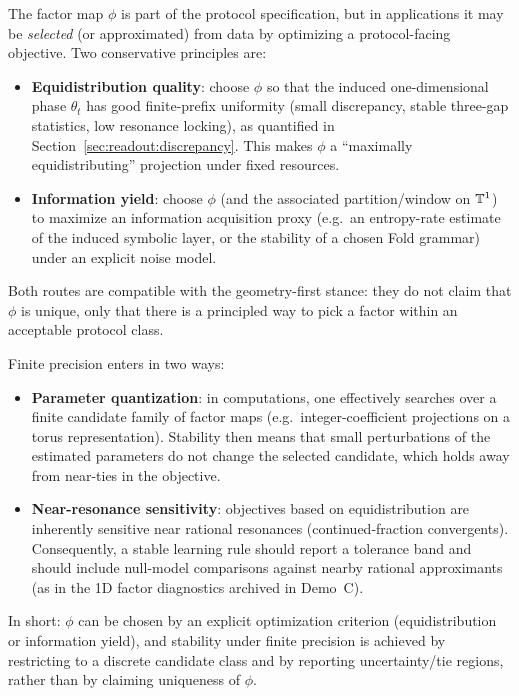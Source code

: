 \begin{remark}\label{rem:learn-phi}
The factor map $\phi$ is part of the protocol specification, but in applications it may be \emph{selected} (or approximated) from data by optimizing a protocol-facing objective. Two conservative principles are:
\begin{itemize}[leftmargin=*,itemsep=2pt]
  \item \textbf{Equidistribution quality}: choose $\phi$ so that the induced one-dimensional phase $\theta_t$ has good finite-prefix uniformity (small discrepancy, stable three-gap statistics, low resonance locking), as quantified in Section~\ref{sec:readout:discrepancy}. This makes $\phi$ a ``maximally equidistributing'' projection under fixed resources.
  \item \textbf{Information yield}: choose $\phi$ (and the associated partition/window on $\mathbb{T}^1$) to maximize an information acquisition proxy (e.g.\ an entropy-rate estimate of the induced symbolic layer, or the stability of a chosen Fold grammar) under an explicit noise model.
\end{itemize}
Both routes are compatible with the geometry-first stance: they do not claim that $\phi$ is unique, only that there is a principled way to pick a factor within an acceptable protocol class.

Finite precision enters in two ways:
\begin{itemize}[leftmargin=*,itemsep=2pt]
  \item \textbf{Parameter quantization}: in computations, one effectively searches over a finite candidate family of factor maps (e.g.\ integer-coefficient projections on a torus representation). Stability then means that small perturbations of the estimated parameters do not change the selected candidate, which holds away from near-ties in the objective.
  \item \textbf{Near-resonance sensitivity}: objectives based on equidistribution are inherently sensitive near rational resonances (continued-fraction convergents). Consequently, a stable learning rule should report a tolerance band and should include null-model comparisons against nearby rational approximants (as in the 1D factor diagnostics archived in Demo~C).
\end{itemize}
In short: $\phi$ can be chosen by an explicit optimization criterion (equidistribution or information yield), and stability under finite precision is achieved by restricting to a discrete candidate class and by reporting uncertainty/tie regions, rather than by claiming uniqueness of $\phi$.
\end{remark}

